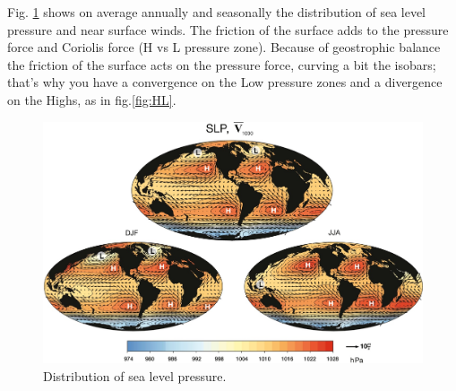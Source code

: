 Fig. \ref{fig:SLP} shows on average annually and seasonally the distribution of sea level pressure and near surface winds. The friction of the surface adds to the pressure force and Coriolis force (H vs L pressure zone). Because of geostrophic balance the friction of the surface acts on the pressure force, curving a bit the isobars; that's why you have a convergence on the Low pressure zones and a divergence on the Highs, as in fig.\ref{fig:HL}.





\begin{figure}[h]
    \centering
    \includegraphics[width=0.5\linewidth]{uploads/SLP.png}
    \caption{Distribution of sea level pressure.}
    \label{fig:SLP}
\end{figure}








